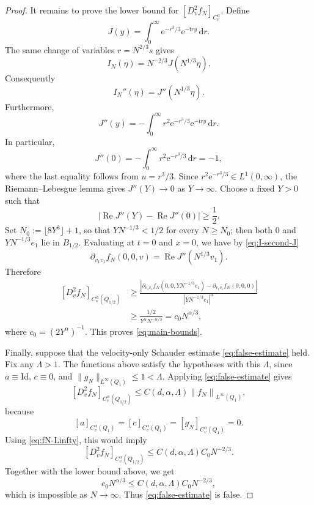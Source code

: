 \documentclass[10pt,a4paper]{amsart}
\numberwithin{equation}{section}
\newcommand{\Id}{\mathrm{Id}}
\newcommand{\ii}{\mathrm{i}}
\newcommand{\e}{\mathrm{e}}
\newcommand{\dd}{\,\mathrm{d}}
\newcommand{\norm}[1]{\left\|#1\right\|}
\newcommand{\abs}[1]{\left|#1\right|}
\begin{document}
\begin{proof}
It remains to prove the lower bound for $[D_v^2f_N]_{C_v^\alpha}$.  %
Define
\begin{equation}\label{eq:J-def}
   J(y)=\int_0^\infty \e^{-r^3/3}\e^{-\ii ry}\dd r.
\end{equation}
The same change of variables $r=N^{2/3}s$ gives
\begin{equation}\label{eq:I-J-scaling}
   I_N(\eta)=N^{-2/3}J(N^{1/3}\eta).
\end{equation}
Consequently
\begin{equation}\label{eq:I-second-J}
   I_N''(\eta)=J''(N^{1/3}\eta).
\end{equation}
Furthermore,
\begin{equation}\label{eq:J-second}
   J''(y)=-\int_0^\infty r^2\e^{-r^3/3}\e^{-\ii ry}\dd r.
\end{equation}
In particular,
\begin{equation}\label{eq:J-zero}
   J''(0)=-\int_0^\infty r^2\e^{-r^3/3}\dd r=-1,
\end{equation}
where the last equality follows from $u=r^3/3$.  Since $r^2\e^{-r^3/3}\in L^1(0,\infty)$, the Riemann--Lebesgue lemma gives $J''(Y)\to0$ as $Y\to\infty$.  Choose a fixed $Y>0$ such that
\begin{equation}\label{eq:Y-choice}
   \abs{\operatorname{Re}J''(Y)-\operatorname{Re}J''(0)}\ge \frac12.
\end{equation}
Set $N_0:=\lfloor 8Y^3\rfloor+1$, so that $YN^{-1/3}<1/2$ for every $N\ge N_0$; then both $0$ and $YN^{-1/3}e_1$ lie in $B_{1/2}$.  Evaluating at $t=0$ and $x=0$, we have by \eqref{eq:I-second-J}
\[
   \partial_{v_1v_1}f_N(0,0,v)=\operatorname{Re}J''(N^{1/3}v_1).
\]
Therefore
\[
\begin{aligned}
   [D_v^2f_N]_{C_v^\alpha(Q_{1/2})}
   &\ge
   \frac{\abs{\partial_{v_1v_1}f_N(0,0,YN^{-1/3}e_1)
          -\partial_{v_1v_1}f_N(0,0,0)}}{|YN^{-1/3}e_1|^\alpha} \\
   &\ge \frac{1/2}{Y^\alpha N^{-\alpha/3}}
    =c_0N^{\alpha/3},
\end{aligned}
\]
where $c_0=(2Y^\alpha)^{-1}$.  This proves \eqref{eq:main-bounds}.

Finally, suppose that the velocity-only Schauder estimate \eqref{eq:false-estimate} held.  Fix any $\Lambda>1$.  The functions above satisfy the hypotheses with this $\Lambda$, since $a\equiv\Id$, $c\equiv0$, and $\|g_N\|_{L^\infty(Q_1)}\le1<\Lambda$.  Applying \eqref{eq:false-estimate} gives
\[
   [D_v^2f_N]_{C_v^\alpha(Q_{1/2})}
   \le C(d,\alpha,\Lambda)\norm{f_N}_{L^\infty(Q_1)},
\]
because
\[
   [a]_{C_v^\alpha(Q_1)}=[c]_{C_v^\alpha(Q_1)}=[g_N]_{C_v^\alpha(Q_1)}=0.
\]
Using \eqref{eq:fN-Linfty}, this would imply
\[
   [D_v^2f_N]_{C_v^\alpha(Q_{1/2})}\le C(d,\alpha,\Lambda)C_0N^{-2/3}.
\]
Together with the lower bound above, we get
\[
   c_0N^{\alpha/3}\le C(d,\alpha,\Lambda)C_0N^{-2/3},
\]
which is impossible as $N\to\infty$.  Thus \eqref{eq:false-estimate} is false.
\end{proof}
\end{document}
